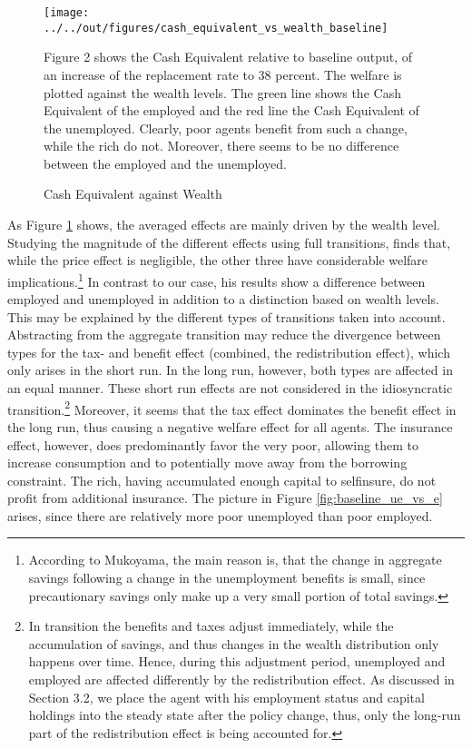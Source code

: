 \documentclass[a4paper,11pt]{article}
\begin{document}
\begin{figure}
\caption{Cash Equivalent against Wealth} 
\label{fig:wealthvswelfare}	%
\centering
\texttt{[image: ../../out/figures/cash\_equivalent\_vs\_wealth\_baseline]}

\begin{minipage}{0.8\linewidth}
\footnotesize{Figure 2 shows the Cash Equivalent relative to baseline output, of an increase of the replacement rate to 38 percent. The welfare is plotted against the wealth levels. The green line shows the Cash Equivalent of the employed and the red line the Cash Equivalent of the unemployed. Clearly, poor agents benefit from such a change, while the rich do not. Moreover, there seems to be no difference between the employed and the unemployed.}
\end{minipage}

\end{figure}
As Figure \ref{fig:wealthvswelfare} shows, the averaged effects are mainly driven by the wealth level. Studying the magnitude of the different effects using full transitions, \cite{mukoyama2012} finds that, while the price effect is negligible, the other three have considerable welfare implications.\footnote{ According to Mukoyama, the main reason is, that the change in aggregate savings following a change in the unemployment benefits is small, since precautionary savings only make up a very small portion of total savings.} In contrast to our case, his results show a difference between employed and unemployed in addition to a distinction based on wealth levels. This may be explained by the different types of transitions taken into account. Abstracting from the aggregate transition may reduce the divergence between types for the tax- and benefit effect (combined, the redistribution effect), which only arises in the short run. In the long run, however, both types are affected in an equal manner. These short run effects are not considered in the idiosyncratic transition.\footnote{In transition the benefits and taxes adjust immediately, while the accumulation of savings, and thus changes in the wealth distribution only happens over time. Hence, during this adjustment period, unemployed and employed are affected differently by the redistribution effect. As discussed in Section 3.2, we place the agent with his employment status and capital holdings into the steady state after the policy change, thus, only the long-run part of the redistribution effect is being accounted for.} Moreover, it seems that the tax effect dominates the benefit effect in the long run, thus causing a negative welfare effect for all agents. The insurance effect, however, does predominantly favor the very poor, allowing them to increase consumption and to potentially move away from the borrowing constraint. The rich, having accumulated enough capital to selfinsure, do not profit from additional insurance.
The picture in Figure \ref{fig:baseline_ue_vs_e} arises, since there are relatively more poor unemployed than poor employed. 
\end{document}
